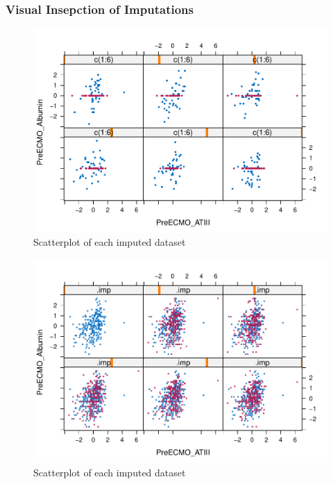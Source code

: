 \documentclass[12pt,]{article}
\begin{document}
\subsubsection{Visual Insepction of
Imputations}\label{visual-insepction-of-imputations}

\begin{figure}[H]

{\centering \includegraphics[width=1\linewidth]{figure/graphics-unnamed-chunk-9-1} 

}

\caption{\label{fig.xyplot-mean}Scatterplot of each imputed dataset}\label{fig:unnamed-chunk-9}
\end{figure}

\begin{figure}[H]

{\centering \includegraphics[width=1\linewidth]{figure/graphics-unnamed-chunk-10-1} 

}

\caption{\label{fig.xyplot-mean}Scatterplot of each imputed dataset}\label{fig:unnamed-chunk-10}
\end{figure}
\end{document}

